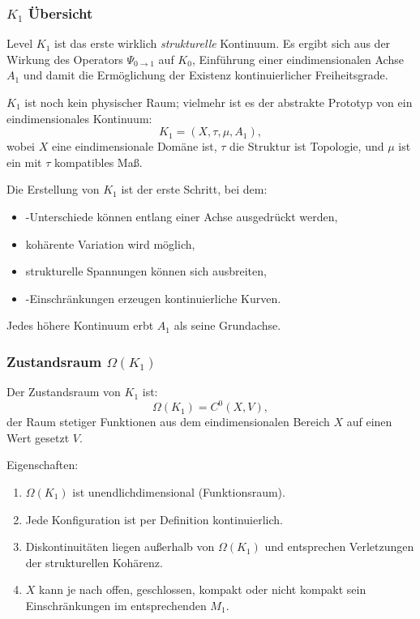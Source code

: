 

\subsubsection{\texorpdfstring{$K_1$}{K_1} Übersicht}
\label{sec:k1-overview}

Level $K_1$ ist das erste wirklich \emph{strukturelle} Kontinuum.
Es ergibt sich aus der Wirkung des Operators $\Psi_{0\to1}$ auf $K_0$,
Einführung einer eindimensionalen Achse $A_1$ und damit die Ermöglichung der Existenz
kontinuierlicher Freiheitsgrade.

$K_1$ ist noch kein physischer Raum; vielmehr ist es der abstrakte Prototyp von
ein eindimensionales Kontinuum:
\[
K_1 = (X, \tau, \mu, A_1),
\]
wobei $X$ eine eindimensionale Domäne ist, $\tau$ die Struktur ist
Topologie, und $\mu$ ist ein mit $\tau$ kompatibles Maß.

Die Erstellung von $K_1$ ist der erste Schritt, bei dem:
\begin{itemize}
    \item-Unterschiede können entlang einer Achse ausgedrückt werden,
    \item kohärente Variation wird möglich,
    \item strukturelle Spannungen können sich ausbreiten,
    \item-Einschränkungen erzeugen kontinuierliche Kurven.
\end{itemize}

Jedes höhere Kontinuum erbt $A_1$ als seine Grundachse.

\subsubsection{Zustandsraum \texorpdfstring{$\Omega(K_1)$}{\Omega(K_1)}}

Der Zustandsraum von $K_1$ ist:
\[
\Omega(K_1) = C^0(X, V),
\]
der Raum stetiger Funktionen aus dem eindimensionalen Bereich $X$
auf einen Wert gesetzt $V$.

Eigenschaften:
\begin{enumerate}
    \item $\Omega(K_1)$ ist unendlichdimensional (Funktionsraum).
    \item Jede Konfiguration ist per Definition kontinuierlich.
    \item Diskontinuitäten liegen außerhalb von $\Omega(K_1)$ und entsprechen
          Verletzungen der strukturellen Kohärenz.
    \item $X$ kann je nach offen, geschlossen, kompakt oder nicht kompakt sein
          Einschränkungen im entsprechenden $M_1$.
\end{enumerate}

